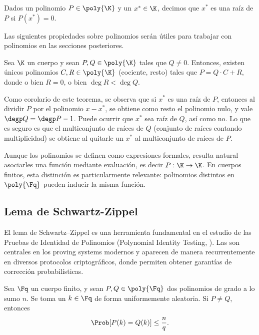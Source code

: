 \begin{definition}
	Dados un polinomio $P \in \poly{\K}$ y un $x^* \in \K$, decimos que $x^*$ es una raíz de $P$ si $P(x^*) = 0$.
\end{definition}

Las siguientes propiedades sobre polinomios serán útiles para trabajar con polinomios en las secciones posteriores.

\begin{theorem}
	Sea $\K$ un cuerpo y sean $P, Q \in \poly{\K}$ tales que $Q \neq 0$. Entonces, existen únicos polinomios $C, R \in \poly{\K}$ (cociente, resto) tales que $P = Q \cdot C + R$, donde o bien $R = 0$, o bien $\deg R < \deg Q$. 
\end{theorem}

Como corolario de este teorema, se observa que si $x^*$ es una raíz de $P$, entonces al dividir $P$ por el polinomio $x - x^*$, se obtiene como resto el polinomio nulo, y vale $\degp Q = \degp P - 1$. Puede ocurrir que $x^*$ sea raíz de $Q$, así como no. Lo que es seguro es que el multiconjunto de raíces de $Q$ (conjunto de raíces contando multiplicidad) se obtiene al quitarle un $x^*$ al multiconjunto de raíces de $P$.

Aunque los polinomios se definen como expresiones formales, resulta natural asociarles una función mediante evaluación, es decir $P: \K \to \K$. En cuerpos finitos, esta distinción es particularmente relevante: polinomios distintos en $\poly{\Fq}$ pueden inducir la misma función.

\subsection{Lema de Schwartz-Zippel}

El lema de Schwartz–Zippel es una herramienta fundamental en el estudio de las Pruebas de Identidad de Polinomios (Polynomial Identity Testing, \PIT). Las \PIT son centrales en los proving systems modernos y aparecen de manera recurrentemente en diversos protocolos criptográficos, donde permiten obtener garantías de corrección probabilísticas.

\begin{theorem}
	Sea $\Fq$ un cuerpo finito, y sean $P, Q \in \poly{\Fq}$ dos polinomios de grado a lo sumo $n$. Se toma un $k \in \Fq$ de forma uniformemente aleatoria. Si $P \neq Q$, entonces
	$$\Prob[P(k) = Q(k)] \leq \frac{n}{q}.$$
\end{theorem}

